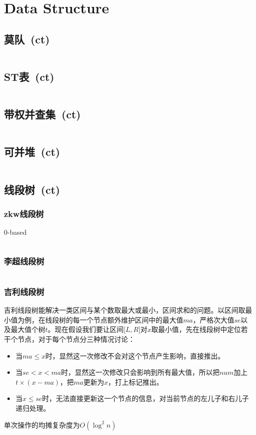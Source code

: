 \chapter{Data Structure}
\section{莫队\ \small(ct)}
	\inputminted{cpp}{DataStructure/mo_dui.cpp}
\section{ST表\ \small(ct)}
	\inputminted{cpp}{DataStructure/st_table.cpp}
\section{带权并查集\ \small(ct)}
	\inputminted{cpp}{DataStructure/union_find_weighted.cpp}
\section{可并堆\ \small(ct)}
	\inputminted{cpp}{DataStructure/mergeable_heap.cpp}
\section{线段树\ \small(ct)}
	\subsection*{zkw线段树}
		$ 0 $-based
		\inputminted{cpp}{DataStructure/zkw_segment_tree.cpp}
	\subsection*{李超线段树}
		\inputminted{cpp}{DataStructure/li_chao_segment_tree.cpp}
	\subsection*{吉利线段树}
		吉利线段树能解决一类区间与某个数取最大或最小，区间求和的问题。以区间取最小值为例，在线段树的每一个节点额外维护区间中的最大值$ ma $，严格次大值$ se $以及最大值个树$ t $。现在假设我们要让区间$ \lbrack L, R \rbrack $对$ x $取最小值，先在线段树中定位若干个节点，对于每个节点分三种情况讨论：
		\begin{itemize}[nosep]
			\item 当$ ma \leq x $时，显然这一次修改不会对这个节点产生影响，直接推出。
			\item 当$ se < x < ma $时，显然这一次修改只会影响到所有最大值，所以把$ num $加上$ t \times (x - ma) $，把$ ma $更新为$ x $，打上标记推出。
			\item 当$ x \leq se $时，无法直接更新这一个节点的信息，对当前节点的左儿子和右儿子递归处理。
		\end{itemize}
		单次操作的均摊复杂度为$ O(\log^2 n) $
